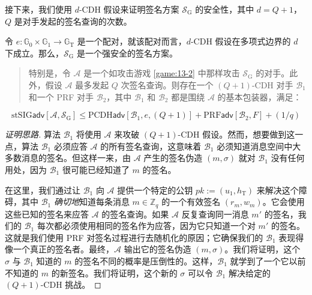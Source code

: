 接下来，我们使用 $d$-CDH 假设来证明签名方案 $\mathcal{S}_\mathrm{G}$ 的安全性，其中 $d=Q+1$，$Q$ 是对手发起的签名查询的次数。

\begin{theorem}\label{theo:15-3}
令 $e:\mathbb{G}_0\times\mathbb{G}_1\to\mathbb{G}_\mathrm{T}$ 是一个配对，就该配对而言，$d$-CDH 假设在多项式边界的 $d$ 下成立。那么，$\mathcal{S}_\mathrm{G}$ 是一个强安全的签名方案。
\begin{quote}
特别是，令 $\mathcal{A}$ 是一个如攻击游戏 \ref{game:13-2} 中那样攻击 $\mathcal{S}_\mathrm{G}$ 的对手。此外，假设 $\mathcal{A}$ 最多发起 $Q$ 次签名查询。则存在一个 $(Q+1)$-CDH 对手 $\mathcal{B}_1$ 和一个 PRF 对手 $\mathcal{B}_2$，其中 $\mathcal{B}_1$ 和 $\mathcal{B}_2$ 都是围绕 $\mathcal{A}$ 的基本包装器，满足：
\end{quote}
\begin{equation}\label{eq:15-20}
\mathrm{stSIG}\mathsf{adv}[\mathcal{A},\mathcal{S}_\mathrm{G}]
\leq
\mathrm{PCDH}\mathsf{adv}[\mathcal{B}_1,e,(Q+1)]+
\mathrm{PRF}\mathsf{adv}[\mathcal{B}_2,F]+
(1/q)
\end{equation}
\end{theorem}

\begin{proof}[证明思路]
算法 $\mathcal{B}_1$ 将使用 $\mathcal{A}$ 来攻破 $(Q+1)$-CDH 假设。然而，想要做到这一点，算法 $\mathcal{B}_1$ 必须应答 $\mathcal{A}$ 的所有签名查询，这意味着 $\mathcal{B}_1$ 必须知道消息空间中大多数消息的签名。但这样一来，由 $\mathcal{A}$ 产生的签名伪造 $(m,\sigma)$ 就对 $\mathcal{B}_1$ 没有任何用处，因为 $\mathcal{B}_1$ 很可能已经知道了 $m$ 的签名。

在这里，我们通过让 $\mathcal{B}_1$ 向 $\mathcal{A}$ 提供一个特定的公钥 $pk:=(u_1,h_\mathrm{T})$ 来解决这个障碍，其中 $\mathcal{B}_1$ \emph{确切地}知道每条消息 $m\in\mathbb{Z}_q$ 的一个有效签名 $(r_m,w_m)$。它会使用这些已知的签名来应答 $\mathcal{A}$ 的签名查询。如果 $\mathcal{A}$ 反复查询同一消息 $m'$ 的签名，我们的 $\mathcal{B}_1$ 每次都必须使用相同的签名作为应答，因为它只知道一个对 $m'$ 的签名。这就是我们使用 PRF 对签名过程进行去随机化的原因；它确保我们的 $\mathcal{B}_1$ 表现得像一个真正的签名者。最终，$\mathcal{A}$ 输出它的签名伪造 $(m,\sigma)$。我们将证明，这个 $\sigma$ 与 $\mathcal{B}_1$ 知道的 $m$ 的签名不同的概率是压倒性的。这样，$\mathcal{B}_1$ 就学到了一个它以前不知道的 $m$ 的新签名。我们将证明，这个新的 $\sigma$ 可以令 $\mathcal{B}_1$ 解决给定的 $(Q+1)$-CDH 挑战。
\end{proof}

